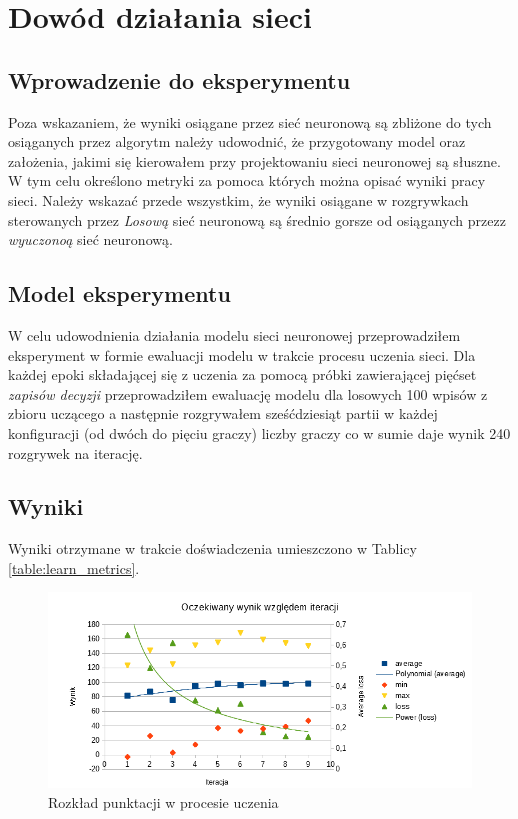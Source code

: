 \documentclass[12pt, oneside]{report}
\begin{document}
\chapter{Dowód działania sieci}
\section{Wprowadzenie do eksperymentu}
Poza wskazaniem, że wyniki osiągane przez sieć neuronową są zbliżone do tych osiąganych przez algorytm należy udowodnić, że przygotowany model oraz założenia, jakimi się kierowałem przy projektowaniu sieci neuronowej są słuszne. W tym celu określono metryki za pomoca których można opisać wyniki pracy sieci. Należy wskazać przede wszystkim, że wyniki osiągane w rozgrywkach sterowanych przez \textit{Losową} sieć neuronową są średnio gorsze od osiąganych przezz \textit{wyuczonoą} sieć neuronową.
\section{Model eksperymentu}
W celu udowodnienia działania modelu sieci neuronowej przeprowadziłem eksperyment w formie ewaluacji modelu w trakcie procesu uczenia sieci. Dla każdej epoki składającej się z uczenia za pomocą próbki zawierającej pięćset \textit{zapisów decyzji} przeprowadziłem ewaluację modelu dla losowych 100 wpisów z zbioru uczącego a następnie rozgrywałem sześćdziesiąt partii w każdej konfiguracji (od dwóch do pięciu graczy) liczby graczy co w sumie daje wynik 240 rozgrywek na iterację.
\section{Wyniki}
Wyniki otrzymane w trakcie doświadczenia umieszczono w Tablicy \ref{table:learn_metrics}.

\begin{figure}
	\includegraphics{WykresPunktowPosteIteracji.png}
	\caption{Rozkład punktacji w procesie uczenia}
	\label{figure:learn_results}
\end{figure}
\end{document}
